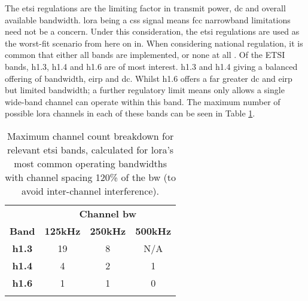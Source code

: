 The \ac{etsi} regulations are the limiting factor in transmit power, \ac{dc} and overall available bandwidth. \ac{lora} being a \ac{css} signal means \ac{fcc} narrowband limitations need not be a concern. Under this consideration, the \ac{etsi} regulations are used as the worst-fit scenario from here on in. When considering national regulation, it is common that either all bands are implemented, or none at all \cite{3YP:CEPT_ERC_REC}. Of the ETSI bands, h1.3, h1.4 and h1.6 are of most interest. h1.3 and h1.4 giving a balanced offering of bandwidth, \ac{eirp} and \ac{dc}. Whilst h1.6 offers a far greater \ac{dc} and \ac{eirp} but limited bandwidth; a further regulatory limit means only allows a single wide-band channel can operate within this band. The maximum number of possible \ac{lora} channels in each of these bands can be seen in Table \ref{tab:ETSILoraChannels}.
\vspace{2.5mm}
\begin{table}[H]
\centering\small
\caption[Maximum channel breakdown for \ac{lora}]{Maximum channel count breakdown for relevant \ac{etsi} bands, calculated for \ac{lora}'s most common operating bandwidths with channel spacing 120\% of the \ac{bw} (to avoid inter-channel interference).}
\label{tab:ETSILoraChannels}
\renewcommand*{\arraystretch}{1.1}
\begin{tabular}{c|ccc}
    \toprule
    & \multicolumn{3}{c}{\textbf{Channel \ac{bw}}}	\\
    \textbf{Band} & \textbf{125kHz} & \textbf{250kHz} & \textbf{500kHz}\\
    \midrule\addlinespace
    \textbf{h1.3} & 19 & 8 & N/A \\
    \textbf{h1.4} & 4 & 2 & 1 \\
    \textbf{h1.6} & 1 & 1 & 0 \\
    \addlinespace\bottomrule
\end{tabular}
\end{table}
